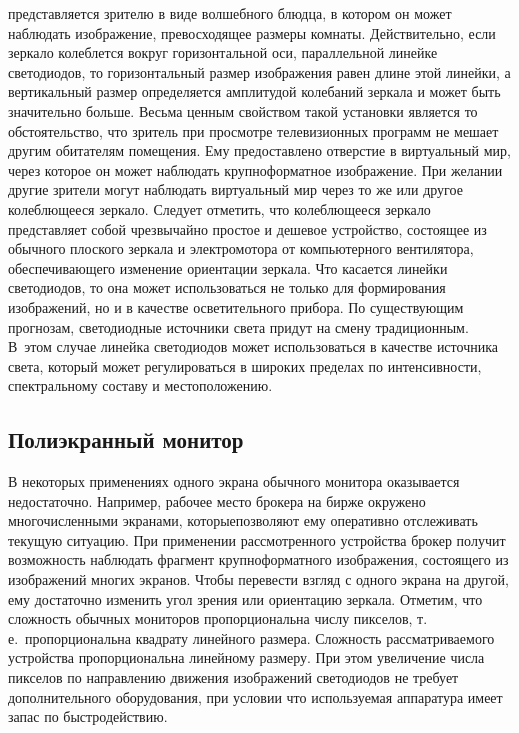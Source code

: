 \begin{multicols}{2}
\noindent
 представляется зрителю в виде волшебного блюдца, 
в котором он может наблюдать изображение, превосходящее размеры комнаты. 
Действительно, если зеркало колеблется вокруг горизонтальной оси, параллельной 
линейке светодиодов, то горизонтальный размер изображения равен длине этой линейки, 
а вертикальный размер определяется амплитудой колебаний зеркала и может быть 
значительно больше. Весьма ценным свойством такой установки является то 
обстоятельство, что зритель при просмотре телевизионных программ не мешает другим 
обитателям помещения. Ему предоставлено отверстие в виртуальный мир, через которое 
он может наблюдать крупноформатное изображение. При желании другие зрители могут 
наблюдать виртуальный мир через то же или другое колеблющееся зеркало. Следует 
отметить, что колеблющееся зеркало представляет собой чрезвычайно простое и дешевое 
устройство, состоящее из обычного плоского зеркала и электромотора от компьютерного 
вентилятора, обеспечивающего изменение ориентации зеркала. Что касается линейки 
светодиодов, то она может использоваться не только для формирования изображений, но 
и в качестве осветительного прибора. По существующим прогнозам, светодиодные 
источники света придут на смену традиционным. В~этом случае линейка светодиодов 
может использоваться в качестве источника света, который может регулироваться в 
широких пределах по интенсивности, спектральному составу и местоположению. 


\subsection{Полиэкранный монитор}

  В некоторых применениях одного экрана обычного монитора оказывается 
недостаточно. На\-при\-мер, рабочее место брокера на бирже окружено многочисленными 
экранами, которые\linebreak позволяют ему оперативно отслеживать текущую ситуацию. При 
применении рассмотренного устройства брокер получит возможность наблюдать 
фрагмент крупноформатного изображения, состоящего из изображений многих экранов. 
Чтобы перевести взгляд с одного экрана на другой, ему достаточно изменить угол зрения 
или ориентацию зеркала. Отметим, что сложность обычных мониторов пропорциональна 
числу пикселов, т.\,е.\ пропорциональна квадрату линейного размера. Сложность 
рас\-смат\-ри\-ва\-емо\-го устройства пропорциональна линейному размеру. При этом увеличение 
числа пикселов по направлению движения изображений светодиодов не требует 
дополнительного оборудования, при условии что используемая аппаратура имеет запас по 
быстродействию. 


\end{multicols}
